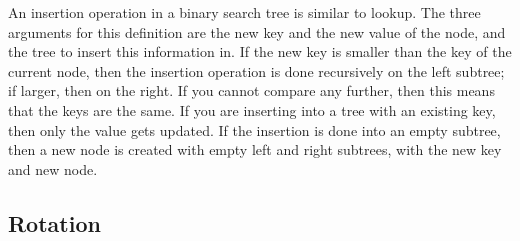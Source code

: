 An insertion operation in a binary search tree is similar to lookup. The three arguments for this definition are the new key and the new value of the node, 
and the tree to insert this information in. If the new key is smaller than the key of the current node, then the insertion operation is done recursively on the left subtree; if larger, then on the right.
If you cannot compare any further, then this means that the keys are the same. If you are inserting into a tree with an existing key, then only the value gets updated. If the insertion is done into an empty subtree, then a new node is created
with empty left and right subtrees, with the new key and new node.



\subsection{Rotation}
